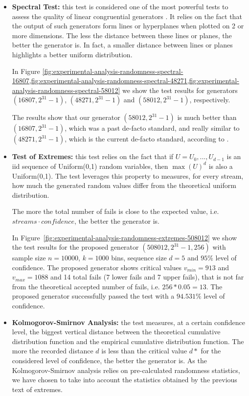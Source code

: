 \begin{itemize}
	\item \textbf{Spectral Test:} this test is considered one of the most powerful tests to assess the quality of linear congruential generators \cite{knuth1981art}. It relies on the fact that the output of such generators form lines or hyperplanes when plotted on 2 or more dimensions. The less the distance between these lines or planes, the better the generator is. In fact, a smaller distance between lines or planes highlights a better uniform distribution.
	
	In Figure \ref{fig:experimental-analysis-randomness-spectral-16807,fig:experimental-analysis-randomness-spectral-48271,fig:experimental-analysis-randomness-spectral-58012} we show the test results for generators $(16807,2^{31}-1)$, $(48271,2^{31}-1)$ and $(58012,2^{31}-1)$, respectively.
	
	The results show that our generator $(58012,2^{31}-1)$ is much better than $(16807, 2^{31}-1)$, which was a past de-facto standard, and really similar to $(48271,2^{31}-1)$, which is the current de-facto standard, according to \cite{leemis2006discrete}.
	
	\item \textbf{Test of Extremes:} this test relies on the fact that if $U=U_{0},...,U_{d-1}$ is an iid sequence of Uniform(0,1) random variables, then $\max(U)^{d}$ is also a Uniform(0,1). The test leverages this property to measures, for every stream, how much the generated random values differ from the theoretical uniform distribution.
	
	The more the total number of fails is close to the expected value, i.e. $streams \cdot confidence$, the better the generator is.
	
	In Figure~\ref{fig:experimental-analysis-randomness-extremes-508012} we show the test results for the proposed generator $(508012,2^{31}-1, 256)$ with sample size $n=10000$, $k=1000$ bins, sequence size $d=5$ and $95\%$ level of confidence.
	The proposed generator shows critical values $v_{min}=913$ and $v_{max}=1088$ and 14 total fails (7 lower fails and 7 upper fails), that is not far from the theoretical accepted number of fails, i.e. $256*0.05=13$.
	The proposed generator successfully passed the test with a $94.531\%$ level of confidence.
	
	\item \textbf{Kolmogorov-Smirnov Analysis:} the test measures, at a certain confidence level, the biggest vertical distance between the theoretical cumulative distribution function and the empirical cumulative distribution function.
	The more the recorded distance $d$ is less than the critical value $d*$ for the considered level of confidence, the better the generator is.
	As the Kolmogorov-Smirnov analysis relies on pre-calculated randomness statistics, we have chosen to take into account the statistics obtained by the previous text of extremes.
	

\end{itemize}
